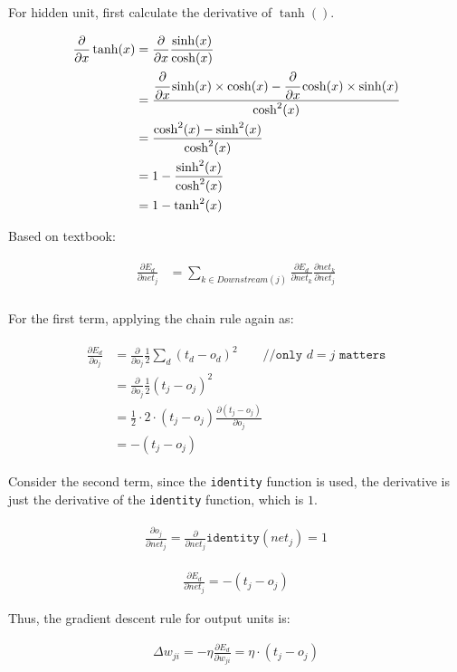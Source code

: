 \documentclass[preview]{standalone}
\begin{document}
For hidden unit, first calculate the derivative of $\tanh()$.

\begin{align}
\begin{split}
\frac{\partial}{\partial x}\tanh(x)
&=\frac{\partial}{\partial x}\frac{\sinh(x)}{\cosh(x)}\\
&=\cfrac{\cfrac{\partial}{\partial
    x}\sinh(x)\times\cosh(x)-\cfrac{\partial}{\partial
    x}\cosh(x)\times\sinh(x)}{\cosh^2(x)}\\
&=\frac{\cosh^2(x)-\sinh^2(x)}{\cosh^2(x)}\\
&=1-\frac{\sinh^2(x)}{\cosh^2(x)}\\
&=1-\tanh^2(x)
\end{split}
\end{align}

Based on textbook:

\begin{align}
\label{i0}
\begin{split}
\frac{\partial E_d}{\partial net_j}
&=\sum_{{k}\in{Downstream(j)}}\frac{\partial E_d}{\partial net_{{k}}}\frac{\partial net_{{k}}}{\partial net_{j}}\\
\end{split}
\end{align}

For the first term, applying the chain rule again as:

\begin{align}
\label{o1}
\begin{split}
\frac{\partial E_d}{\partial o_j}
&=\frac{\partial}{\partial o_j}\frac{1}{2}\sum_d(t_d-o_d)^2\qquad\texttt{//only $d = j$ matters}\\
&=\frac{\partial}{\partial o_j}\frac{1}{2}(t_j-o_j)^2\\
&=\frac{1}{2} \cdot 2 \cdot (t_j-o_j)\frac{\partial(t_j-o_j)}{\partial o_j}\\
&=-(t_j-o_j)
\end{split}
\end{align}

Consider the second term, since the \texttt{identity} function is used, the
derivative is just the derivative of the \texttt{identity} function, which is
$1$.

\begin{align}
\label{o2}
\begin{split}
\frac{\partial o_j}{\partial net_j}=\frac{\partial}{\partial net_j}\mathtt{identity}(net_j) = 1
\end{split}
\end{align}


\begin{align}
    \frac{\partial E_d}{\partial net_j}=-(t_j-o_j)
\end{align}

Thus, the gradient descent rule for output units is:

\begin{align}
\Delta w_{ji} = -\eta\frac{\partial E_d}{\partial w_{ji}} = \eta \cdot (t_j-o_j)
\end{align}
\end{document}
